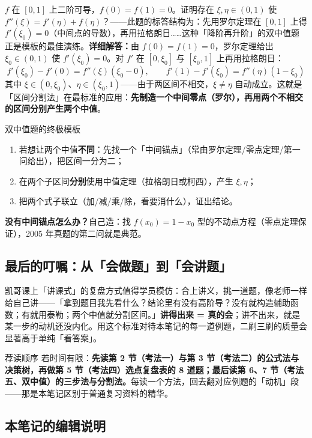 \documentclass[a4paper]{article}
\begin{document}
$f$ 在 $[0,1]$ 上二阶可导，$f(0)=f(1)=0$。证明存在 $\xi,\eta\in(0,1)$ 使 $f''(\xi)=f'(\eta)+f(\eta)$？——此题的标答结构为：先用罗尔定理在 $[0,1]$ 上得 $f'(\xi_0)=0$（中间点的导数），再用拉格朗日……这种「降阶再升阶」的双中值题正是模板的最佳演练。\textbf{详细解答：}由 $f(0)=f(1)=0$，罗尔定理给出 $\xi_0\in(0,1)$ 使 $f'(\xi_0)=0$。对 $f'$ 在 $[0,\xi_0]$ 与 $[\xi_0,1]$ 上再用拉格朗日：
\[
f'(\xi_0)-f'(0)=f''(\xi)(\xi_0-0),\qquad f'(1)-f'(\xi_0)=f''(\eta)(1-\xi_0)
\]
其中 $\xi\in(0,\xi_0)$、$\eta\in(\xi_0,1)$——由于两区间不相交，$\xi\neq\eta$ 自动成立。这就是「区间分割法」在最标准的应用：\textbf{先制造一个中间零点（罗尔），再用两个不相交的区间分别产生两个中值}。

\begin{importantbox}{双中值题的终极模板}
\begin{enumerate}
\item 若想让两个中值\textbf{不同}：先找一个「中间锚点」（常由罗尔定理/零点定理/第一问给出），把区间一分为二；
\item 在两个子区间\textbf{分别}使用中值定理（拉格朗日或柯西），产生 $\xi,\eta$；
\item 把两个式子联立（加/减/乘/除，看要消什么），证出结论。
\end{enumerate}
\textbf{没有中间锚点怎么办？}自己造：找 $f(x_0)=1-x_0$ 型的不动点方程（零点定理保证），2005 年真题的第二问就是典范。
\end{importantbox}

\subsection{最后的叮嘱：从「会做题」到「会讲题」}

凯哥课上「讲课式」的复盘方式值得学员模仿：合上讲义，挑一道题，像老师一样给自己讲——「拿到题目我先看什么？结论里有没有高阶导？没有就构造辅助函数；有就用泰勒；两个中值就分割区间。」\textbf{讲得出来 = 真的会}；讲不出来，就是某一步的动机还没内化。用这个标准对待本笔记的每一道例题，二刷三刷的质量会显著高于单纯「看答案」。

\begin{knowledgebox}{荐读顺序}
若时间有限：\textbf{先读第 2 节（考法一）与第 3 节（考法二）的公式法与决策树，再做第 5 节（考法四）选点复盘表的 8 道题；最后读第 6、7 节（考法五、双中值）的三步法与分割法。}每读一个方法，回去翻对应例题的「动机」段——那是本笔记区别于普通复习资料的精华。
\end{knowledgebox}


\subsection{本笔记的编辑说明}
\end{document}
